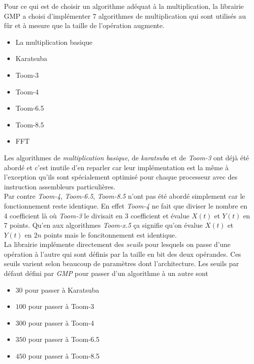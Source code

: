\documentclass[letterpaper]{article}
\begin{document}
Pour ce qui est de choisir un algorithme adéquat à la multiplication,
la librairie GMP a choisi d'implémenter 7 algorithmes de multiplication
qui sont utilisés au fûr et à mesure que la taille de l'opération
augmente\cite{gmplibmultiplication}.

\begin{itemize}
  \item La multiplication basique
  \item Karatsuba
  \item Toom-3
  \item Toom-4
  \item Toom-6.5
  \item Toom-8.5
  \item FFT
\end{itemize}

Les algorithmes de \emph{multiplication basique}, de \emph{karatsuba} et de
\emph{Toom-3} ont déjà été abordé et c'est inutile d'en reparler car leur
implémentation est la même à l'exception qu'ils sont spécialement optimisé pour
chaque processeur avec des instruction assembleurs particulières.\\

Par contre \emph{Toom-4}, \emph{Toom-6.5}, \emph{Toom-8.5} n'ont pas été abordé
simplement car le fonctionnement reste identique. En effet \emph{Toom-4} ne
fait que diviser le nombre en 4 coefficient là où \emph{Toom-3} le divisait en
3 coefficient\cite{gmplibtoom4} et évalue $X(t)$ et $Y(t)$ en 7 points. Qu'en
aux algorithmes \emph{Toom-x.5} ça signifie qu'on évalue $X(t)$ et $Y(t)$ en
$2n$ points mais le foncitonnement est identique\cite{gmplibtoomhalf}.\\

La librairie implémente directement des \emph{seuils} pour lesquels
on passe d'une opération à l'autre qui sont définis par la taille en bit des
deux opérandes. Ces seuils varient selon beaucoup de paramètres dont
l'architecture. Les seuils par défaut défini par \emph{GMP} pour passer d'un
algorithme à un autre sont

\begin{itemize}
  \item $30$ pour passer à Karatsuba
  \item $100$ pour passer à Toom-3
  \item $300$ pour passer à Toom-4
  \item $350$ pour passer à Toom-6.5
  \item $450$ pour passer à Toom-8.5
\end{itemize}

\footnotesize


\end{document}
